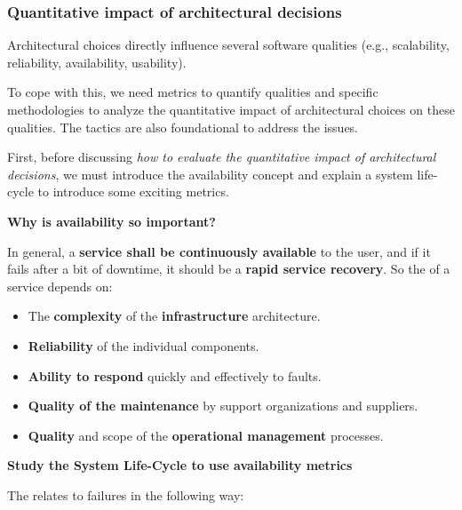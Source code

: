 \subsubsection{Quantitative impact of architectural decisions}

Architectural choices directly influence several software qualities (e.g., scalability, reliability, availability, usability).

\highspace
To cope with this, we need metrics to quantify qualities and specific methodologies to analyze the quantitative impact of architectural choices on these qualities. The tactics are also foundational to address the issues.

\highspace
First, before discussing \emph{how to evaluate the quantitative impact of architectural decisions}, we must introduce the availability concept and explain a system life-cycle to introduce some exciting metrics.

\begin{flushleft}
    \textcolor{Green3}{ \textbf{Why is availability so important?}}
\end{flushleft}
In general, a \textbf{service shall be continuously available} to the user, and if it fails after a bit of downtime, it should be a \textbf{rapid service recovery}. So the  of a service depends on:
\begin{itemize}
    \item The \textbf{complexity} of the \textbf{infrastructure} architecture.
    
    \item \textbf{Reliability} of the individual components.
    
    \item \textbf{Ability to respond} quickly and effectively to faults.

    \item \textbf{Quality of the maintenance} by support organizations and suppliers.

    \item \textbf{Quality} and scope of the \textbf{operational management} processes.
\end{itemize}

\begin{flushleft}
    \textcolor{Green3}{ \textbf{Study the System Life-Cycle to use availability metrics}}
\end{flushleft}
The  relates to failures in the following way:


